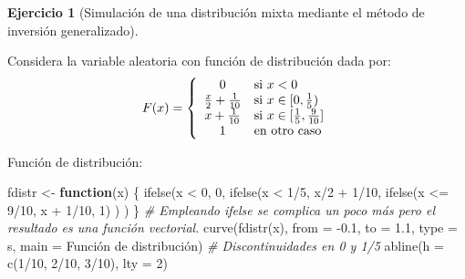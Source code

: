 \documentclass[
]{book}
\newenvironment{Shaded}{\begin{snugshade}}{\end{snugshade}}
\newcommand{\AttributeTok}[1]{\textcolor[rgb]{0.77,0.63,0.00}{#1}}
\newcommand{\CommentTok}[1]{\textcolor[rgb]{0.56,0.35,0.01}{\textit{#1}}}
\newcommand{\ControlFlowTok}[1]{\textcolor[rgb]{0.13,0.29,0.53}{\textbf{#1}}}
\newcommand{\DecValTok}[1]{\textcolor[rgb]{0.00,0.00,0.81}{#1}}
\newcommand{\FloatTok}[1]{\textcolor[rgb]{0.00,0.00,0.81}{#1}}
\newcommand{\FunctionTok}[1]{\textcolor[rgb]{0.00,0.00,0.00}{#1}}
\newcommand{\NormalTok}[1]{#1}
\newcommand{\OtherTok}[1]{\textcolor[rgb]{0.56,0.35,0.01}{#1}}
\newcommand{\SpecialCharTok}[1]{\textcolor[rgb]{0.00,0.00,0.00}{#1}}
\newcommand{\StringTok}[1]{\textcolor[rgb]{0.31,0.60,0.02}{#1}}
\theoremstyle{break}
\theoremstyle{definition}
\theoremstyle{definition}
\theoremstyle{definition}
\newtheorem{exercise}{Ejercicio}[chapter]
\theoremstyle{definition}
\theoremstyle{remark}
\begin{document}
\begin{exercise}[Simulación de una distribución mixta mediante el método de inversión generalizado]
\protect\hypertarget{exr:mixta-cuantil}{}{\label{exr:mixta-cuantil} {} }
\end{exercise}

Considera la variable aleatoria con función
de distribución dada por:
\[F(x)=\left\{
\begin{array}
[c]{cl}0 & \mbox{si $x<0$}\\
\frac{x}{2}+\frac{1}{10} & \mbox{si $x\in[0,\frac{1}{5})$}\\
x+\frac{1}{10} & \mbox{si $x\in[\frac{1}{5},\frac{9}{10}]$}\\
1 & \mbox{en otro caso}
\end{array}
\right.\]

Función de distribución:

\begin{Shaded}
\begin{Highlighting}[]
\NormalTok{fdistr }\OtherTok{\textless{}{-}} \ControlFlowTok{function}\NormalTok{(x) \{}
\FunctionTok{ifelse}\NormalTok{(x }\SpecialCharTok{\textless{}} \DecValTok{0}\NormalTok{, }\DecValTok{0}\NormalTok{,}
    \FunctionTok{ifelse}\NormalTok{(x }\SpecialCharTok{\textless{}} \DecValTok{1}\SpecialCharTok{/}\DecValTok{5}\NormalTok{, x}\SpecialCharTok{/}\DecValTok{2} \SpecialCharTok{+} \DecValTok{1}\SpecialCharTok{/}\DecValTok{10}\NormalTok{,}
        \FunctionTok{ifelse}\NormalTok{(x }\SpecialCharTok{\textless{}=} \DecValTok{9}\SpecialCharTok{/}\DecValTok{10}\NormalTok{, x }\SpecialCharTok{+} \DecValTok{1}\SpecialCharTok{/}\DecValTok{10}\NormalTok{, }\DecValTok{1}\NormalTok{) ) )}
\NormalTok{\}}
\CommentTok{\# Empleando ifelse se complica un poco más pero el resultado es una función vectorial.}
\FunctionTok{curve}\NormalTok{(}\FunctionTok{fdistr}\NormalTok{(x), }\AttributeTok{from =} \SpecialCharTok{{-}}\FloatTok{0.1}\NormalTok{, }\AttributeTok{to =} \FloatTok{1.1}\NormalTok{, }\AttributeTok{type =} \StringTok{\textquotesingle{}s\textquotesingle{}}\NormalTok{, }
      \AttributeTok{main =} \StringTok{\textquotesingle{}Función de distribución\textquotesingle{}}\NormalTok{)}
\CommentTok{\# Discontinuidades en 0 y 1/5}
\FunctionTok{abline}\NormalTok{(}\AttributeTok{h =} \FunctionTok{c}\NormalTok{(}\DecValTok{1}\SpecialCharTok{/}\DecValTok{10}\NormalTok{, }\DecValTok{2}\SpecialCharTok{/}\DecValTok{10}\NormalTok{, }\DecValTok{3}\SpecialCharTok{/}\DecValTok{10}\NormalTok{), }\AttributeTok{lty =} \DecValTok{2}\NormalTok{) }
\end{Highlighting}
\end{Shaded}
\end{document}
